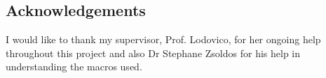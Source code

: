 \documentclass[a0,portrait]{a0poster}
\begin{document}
\begin{multicols}{2}

\section*{Acknowledgements}

I would like to thank my supervisor, Prof. Lodovico, for her ongoing help throughout this project and also Dr Stephane Zsoldos for his help in understanding the macros used.


\end{multicols}
\end{document}
